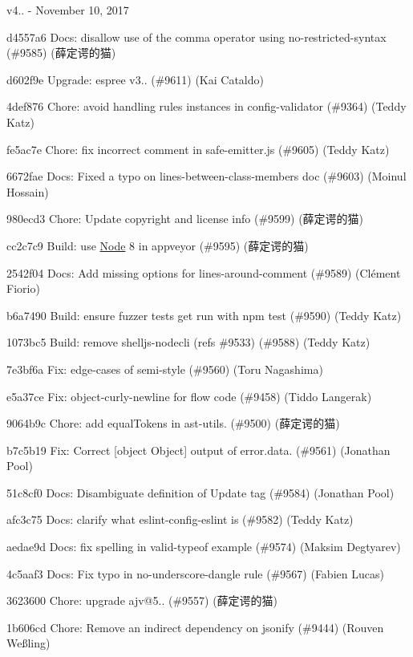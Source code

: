 v4.. -\/ November 10, 2017


\begin{DoxyItemize}
\item d4557a6 Docs\+: disallow use of the comma operator using no-\/restricted-\/syntax (\#9585) (薛定谔的猫)
\item d602f9e Upgrade\+: espree v3.. (\#9611) (Kai Cataldo)
\item 4def876 Chore\+: avoid handling rules instances in config-\/validator (\#9364) (Teddy Katz)
\item fe5ac7e Chore\+: fix incorrect comment in safe-\/emitter.\+js (\#9605) (Teddy Katz)
\item 6672fae Docs\+: Fixed a typo on lines-\/between-\/class-\/members doc (\#9603) (Moinul Hossain)
\item 980ecd3 Chore\+: Update copyright and license info (\#9599) (薛定谔的猫)
\item cc2c7c9 Build\+: use \mbox{\hyperlink{class_node}{Node}} 8 in appveyor (\#9595) (薛定谔的猫)
\item 2542f04 Docs\+: Add missing options for {\ttfamily lines-\/around-\/comment} (\#9589) (Clément Fiorio)
\item b6a7490 Build\+: ensure fuzzer tests get run with {\ttfamily npm test} (\#9590) (Teddy Katz)
\item 1073bc5 Build\+: remove shelljs-\/nodecli (refs \#9533) (\#9588) (Teddy Katz)
\item 7e3bf6a Fix\+: edge-\/cases of semi-\/style (\#9560) (Toru Nagashima)
\item e5a37ce Fix\+: object-\/curly-\/newline for flow code (\#9458) (Tiddo Langerak)
\item 9064b9c Chore\+: add equal\+Tokens in ast-\/utils. (\#9500) (薛定谔的猫)
\item b7c5b19 Fix\+: Correct \mbox{[}object Object\mbox{]} output of error.\+data. (\#9561) (Jonathan Pool)
\item 51c8cf0 Docs\+: Disambiguate definition of Update tag (\#9584) (Jonathan Pool)
\item afc3c75 Docs\+: clarify what eslint-\/config-\/eslint is (\#9582) (Teddy Katz)
\item aedae9d Docs\+: fix spelling in valid-\/typeof example (\#9574) (Maksim Degtyarev)
\item 4c5aaf3 Docs\+: Fix typo in no-\/underscore-\/dangle rule (\#9567) (Fabien Lucas)
\item 3623600 Chore\+: upgrade ajv@5.. (\#9557) (薛定谔的猫)
\item 1b606cd Chore\+: Remove an indirect dependency on jsonify (\#9444) (Rouven Weßling)

\end{DoxyItemize}
